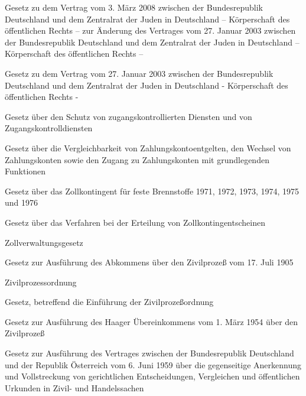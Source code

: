 \item[{ZJDVtrÄndVtrG}] Gesetz zu dem Vertrag vom 3. März 2008 zwischen der Bundesrepublik Deutschland und dem Zentralrat der Juden in Deutschland – Körperschaft des öffentlichen Rechts – zur Änderung des Vertrages vom 27. Januar 2003 zwischen der Bundesrepublik Deutschland und dem Zentralrat der Juden in Deutschland – Körperschaft des öffentlichen Rechts –

\item[{ZJDVtrG}] Gesetz zu dem Vertrag vom 27. Januar 2003 zwischen der Bundesrepublik Deutschland und dem Zentralrat der Juden in Deutschland - Körperschaft des öffentlichen Rechts -

\item[{ZKDSG}] Gesetz über den Schutz von zugangskontrollierten Diensten und von Zugangskontrolldiensten

\item[{ZKG}] Gesetz über die Vergleichbarkeit von Zahlungskontoentgelten, den Wechsel von Zahlungskonten sowie den Zugang zu Zahlungskonten mit grundlegenden Funktionen

\item[{ZKtgBrennstG}] Gesetz über das Zollkontingent für feste Brennstoffe 1971, 1972, 1973, 1974, 1975 und 1976

\item[{ZKtgScheinG}] Gesetz über das Verfahren bei der Erteilung von Zollkontingentscheinen

\item[{ZollVG}] Zollverwaltungsgesetz

\item[{ZPAbkAG}] Gesetz zur Ausführung des Abkommens über den Zivilprozeß vom 17. Juli 1905

\item[{ZPO}] Zivilprozessordnung

\item[{ZPOEG}] Gesetz, betreffend die Einführung der Zivilprozeßordnung

\item[{ZPÜbkHaagG}] Gesetz zur Ausführung des Haager Übereinkommens vom 1. März 1954 über den Zivilprozeß

\item[{ZPVtrAUTAG}] Gesetz zur Ausführung des Vertrages zwischen der Bundesrepublik Deutschland und der Republik Österreich vom 6. Juni 1959 über die gegenseitige Anerkennung und Vollstreckung von gerichtlichen Entscheidungen, Vergleichen und öffentlichen Urkunden in Zivil- und Handelssachen

